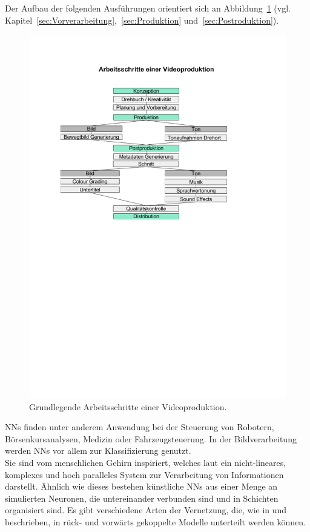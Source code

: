 \documentclass[times, 12pt,twocolumn]{article}
\begin{document}
Der Aufbau der folgenden Ausführungen orientiert sich an Abbildung~\ref{fig:Videoproduktion} (vgl. Kapitel~\ref{sec:Vorverarbeitung},~\ref{sec:Produktion} und~\ref{sec:Postroduktion}).


\begin{figure}
	\flushleft
	\includegraphics[width=\columnwidth, trim = 20mm 145mm 45mm 40mm, clip]{Bilder/ArbeitsschritteVideoproduktion.pdf}
	\caption{Grundlegende Arbeitsschritte einer Videoproduktion.}
	\label{fig:Videoproduktion}
\end{figure}
 \label{sec:NeuronaleNetze}

NNs finden unter anderem Anwendung bei der Steuerung von Robotern, Börsenkursanalysen, Medizin oder Fahrzeugsteuerung. In der Bildverarbeitung werden NNs vor allem zur Klassifizierung genutzt. \\
Sie sind vom menschlichen Gehirn inspiriert, welches laut \cite{NNHaykin} ein nicht-lineares, komplexes und hoch paralleles System zur Verarbeitung von Informationen darstellt. Ähnlich wie dieses bestehen künstliche NNs aus einer Menge an simulierten Neuronen, die untereinander verbunden sind und in Schichten organisiert sind. Es gibt verschiedene Arten der Vernetzung, die, wie in \cite{NNHaykin} und \cite{NNStanley} beschrieben, in rück- und vorwärts gekoppelte Modelle unterteilt werden können.\\
\end{document}
